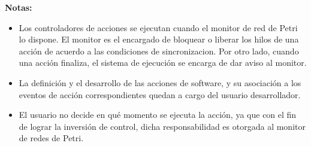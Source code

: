 \begin{framed}
\textbf{Notas:} 
\begin{itemize}
\item Los controladores de acciones se ejecutan cuando el monitor de red de
Petri lo dispone. El monitor es el encargado de bloquear o liberar los hilos de una
acción de acuerdo a las condiciones de sincronizacion. Por otro lado, cuando una
acción finaliza, el sistema de ejecución se encarga de dar aviso al monitor.

\item La definición y el desarrollo de las acciones de software, y su
asociación a los eventos de acción correspondientes quedan a cargo del usuario
desarrollador. 

\item El usuario no decide en qué momento se ejecuta la acción, ya que
con el fin de lograr la inversión de control, dicha responsabilidad es otorgada
al monitor de redes de Petri.
\end{itemize}
\end{framed}
